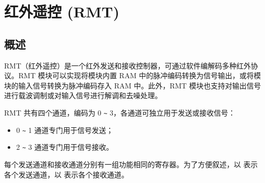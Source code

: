 \documentclass[main\_\_CN.tex]{subfiles}
\begin{document}

\ifglobal
\else
    {\let\clearpage\relax \listoftodos}
    {\let\clearpage\relax \listofdonetodos}
    \tableofcontents
\fi



\hypertarget{rmt}{}
\chapter{红外遥控 (RMT)}
\label{mod:rmt}


\section{概述}
RMT（红外遥控）是一个红外发送和接收控制器，可通过软件编解码多种红外协议。RMT 模块可以实现将模块内置 RAM 中的脉冲编码转换为信号输出，或将模块的输入信号转换为脉冲编码存入 RAM 中。此外，RMT 模块也支持对输出信号进行载波调制或对输入信号进行解调和去噪处理。

RMT 共有四个通道，编码为 0 \verb+~+ 3，各通道可独立用于发送或接收信号：
\begin{itemize}
\item 0 \verb+~+ 1 通道专门用于信号发送；
\item 2 \verb+~+ 3 通道专门用于信号接收。
\end{itemize}
每个发送通道和接收通道分别有一组功能相同的寄存器。为了方便叙述，以  表示各个发送通道，以  表示各个接收通道。
\end{document}
